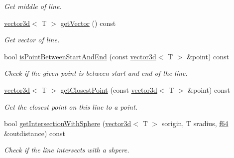 \begin{DoxyCompactItemize}
\begin{DoxyCompactList}\small\item\em Get middle of line. \end{DoxyCompactList}\item 
\hyperlink{classirr_1_1core_1_1vector3d}{vector3d}$<$ T $>$ \hyperlink{classirr_1_1core_1_1line3d_a8df2350580b6be884b6f6d48c8932795}{get\+Vector} () const
\begin{DoxyCompactList}\small\item\em Get vector of line. \end{DoxyCompactList}\item 
bool \hyperlink{classirr_1_1core_1_1line3d_abe1e874f2058e965bc52802c41672fbc}{is\+Point\+Between\+Start\+And\+End} (const \hyperlink{classirr_1_1core_1_1vector3d}{vector3d}$<$ T $>$ \&point) const
\begin{DoxyCompactList}\small\item\em Check if the given point is between start and end of the line. \end{DoxyCompactList}\item 
\hyperlink{classirr_1_1core_1_1vector3d}{vector3d}$<$ T $>$ \hyperlink{classirr_1_1core_1_1line3d_a40fefd94d9fe0d206eb46e6db52826dc}{get\+Closest\+Point} (const \hyperlink{classirr_1_1core_1_1vector3d}{vector3d}$<$ T $>$ \&point) const
\begin{DoxyCompactList}\small\item\em Get the closest point on this line to a point. \end{DoxyCompactList}\item 
bool \hyperlink{classirr_1_1core_1_1line3d_a1315915ed1b1fb8a11eb8b561be193a0}{get\+Intersection\+With\+Sphere} (\hyperlink{classirr_1_1core_1_1vector3d}{vector3d}$<$ T $>$ sorigin, T sradius, \hyperlink{namespaceirr_a1325b02603ad449f92c68fc640af9b28}{f64} \&outdistance) const
\begin{DoxyCompactList}\small\item\em Check if the line intersects with a shpere. \end{DoxyCompactList}\end{DoxyCompactItemize}
